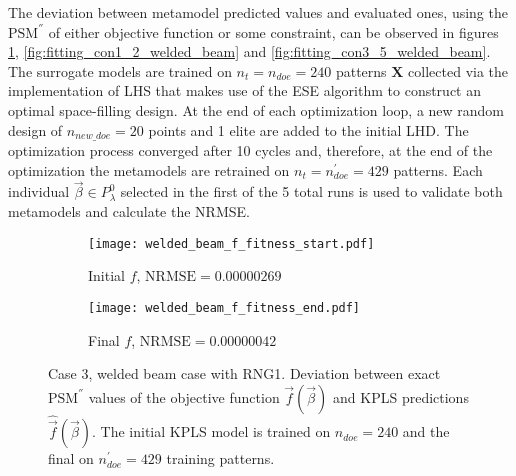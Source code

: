 The deviation between metamodel predicted values and evaluated 
ones, using the $\mathrm{PSM}^{''}$ of either objective function or 
some constraint, can be observed in figures 
\ref{fig:fitting_f_welded_beam}, 
\ref{fig:fitting_con1_2_welded_beam} and 
\ref{fig:fitting_con3_5_welded_beam}. The surrogate models are 
trained on $n_{t} \!= \!n_{doe} \!= \!240$ patterns $\mathbf{X}$ 
collected via the implementation of LHS that makes use of the ESE 
algorithm to construct an optimal space-filling design. At the end 
of each optimization loop, a new random design of $n_{new\_doe} \!= 
\!20$ points and 1 elite are added to the initial LHD. The 
optimization process converged after 10 cycles and, therefore, at 
the end of the optimization the metamodels are retrained on $n_{t} 
\!= \!n_{doe}^{'} \!= \!429$ patterns. Each individual $\vec{β} \!
\in \!P_{λ}^{0}$ selected in the first of the 5 total runs is used 
to validate both metamodels and calculate the NRMSE.
\vspace{-2mm}
\begin{figure}[h!]
\centering
    \begin{subfigure}[b]{0.45\textwidth}
    \centering
    \caption{Initial $f$, $\mathrm{NRMSE} \!= \!0.00000269$}
    \texttt{[image: welded\_beam\_f\_fitness\_start.pdf]}    
    \end{subfigure}
    \hfill
    \begin{subfigure}[b]{0.45\textwidth}
    \centering
    \caption{Final $f$, $\mathrm{NRMSE} \!= \!0.00000042$}
    \texttt{[image: welded\_beam\_f\_fitness\_end.pdf]} 
    \end{subfigure}
    \caption{Case 3, welded beam case with RNG1. Deviation between 
    exact $\mathrm{PSM}^{''}$ values of the objective function 
    $\vec{f}(\vec{β})$ and KPLS predictions $\hat{\vec{f}}(\vec{β})
    $. The initial KPLS model is trained on $n_{doe} \!= \!240$ and 
    the final on $n_{doe}^{'} \!= \!429$ training patterns.}
    \label{fig:fitting_f_welded_beam}
\end{figure}
\vspace{-4mm}
